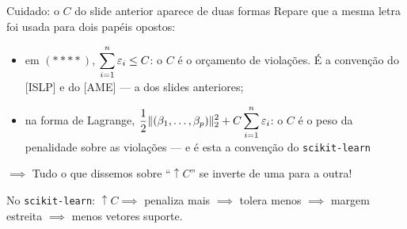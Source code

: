 \begin{frame}{Cuidado: o $C$ do slide anterior aparece de duas formas}
    Repare que a \alert{mesma letra} foi usada para dois papéis \alert{opostos}:

    \pause

    \begin{itemize}
        \item em $(****)$, $\displaystyle \sum_{i = 1}^{n} \varepsilon_i \leq C$: o $C$ é o \alert{orçamento} de violações. É a convenção do [ISLP] e do [AME] --- a dos slides anteriores;

        \pause

        \item na forma de Lagrange, $\displaystyle \frac{1}{2}\|(\beta_1, \dots, \beta_p)\|_2^2 + C\sum_{i = 1}^{n} \varepsilon_i$: o $C$ é o \alert{peso da penalidade} sobre as violações --- e é esta a convenção do \texttt{scikit-learn}
    \end{itemize}

    \pause

    \begin{center}
        $\implies$ Tudo o que dissemos sobre ``$\uparrow C$'' se \alert{inverte} de uma para a outra!
    \end{center}

    \pause

    No \texttt{scikit-learn}: $\uparrow C \implies$ penaliza mais $\implies$ tolera menos $\implies$ margem \alert{estreita} $\implies$ \alert{menos} vetores suporte.
\end{frame}



